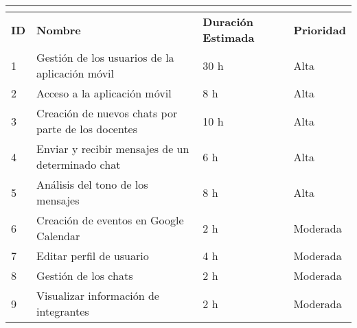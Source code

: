 \resizebox{15cm}{!} {
	\begin{tabular}{|l|l|l|l|}
		\hline
		\multicolumn{4}{|c|}{\cellcolor[HTML]{343434}{\color[HTML]{FFFFFF} \textbf{Pila de Producto}}} \\ \hline
		\textbf{ID}              & \textbf{Nombre}              & \textbf{Duración Estimada}             & \textbf{Prioridad}             \\ \hline
		1               &  Gestión de los usuarios de la aplicación móvil                   & 30 h                              & Alta                      \\ \hline
		2               & Acceso a la aplicación móvil                    & 8 h                               & Alta                      \\ \hline
		3               & Creación de nuevos chats por parte de los docentes   & 10 h            & Alta                      \\ \hline
		4               & Enviar y recibir mensajes de un determinado chat                    & 6 h                     & Alta                      \\ \hline
		5               & Análisis del tono de los mensajes                    & 8 h                               & Alta                      \\ \hline
		6               & Creación de eventos en Google Calendar                    & 2 h                               & Moderada                  \\ \hline
		7               & Editar perfil de usuario                    & 4 h                               & Moderada                      \\ \hline
		8               & Gestión de los chats                    & 2 h                               & Moderada                      \\ \hline
		9               & Visualizar información de integrantes                    & 2 h                               & Moderada                      \\ \hline
	\end{tabular}
}